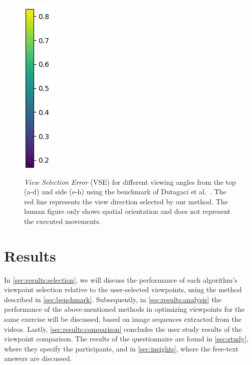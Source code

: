 \begin{figure}[ht]
	    \includegraphics[width=0.041\linewidth]{pictures/scale.png}
	\caption[Comparison of our method to user selected view points.]{\emph{View Selection Error} (VSE) for different viewing angles from the top (a-d) and side (e-h) using the benchmark of Dutagaci et al.~\cite{dutagaci2010bbv}. The red line represents the view direction selected by our method. The human figure only shows spatial orientation and does not represent the executed movements.}
	\label{fig:colorMaps}
\end{figure}

\section{Results\label{results}}
In \autoref{sec:results:selection}, we will discuss the performance of each algorithm's viewpoint selection relative to the user-selected viewpoints, using the method described in \autoref{sec:benchmark}. Subsequently, in \autoref{sec:results:analysis} the performance of the above-mentioned methods in optimizing viewpoints for the same exercise will be discussed, based on image sequences extracted from the videos. Lastly, \autoref{sec:results:comparison} concludes the user study results of the viewpoint comparison. The results of the questionnaire are found in \autoref{sec:study}, where they specify the participants, and in \autoref{sec:insights}, where the free-text answers are discussed.

